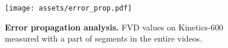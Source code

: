 \begin{figure}[t!]
\centering
    \texttt{[image: assets/error\_prop.pdf]}
    \vspace{-0.15in}
    \caption{\textbf{Error propagation analysis.} FVD values on Kinetics-600 measured with a part of segments in the entire videos.}
    \label{fig:analysis}
    \vspace{-0.2in}
\end{figure}
